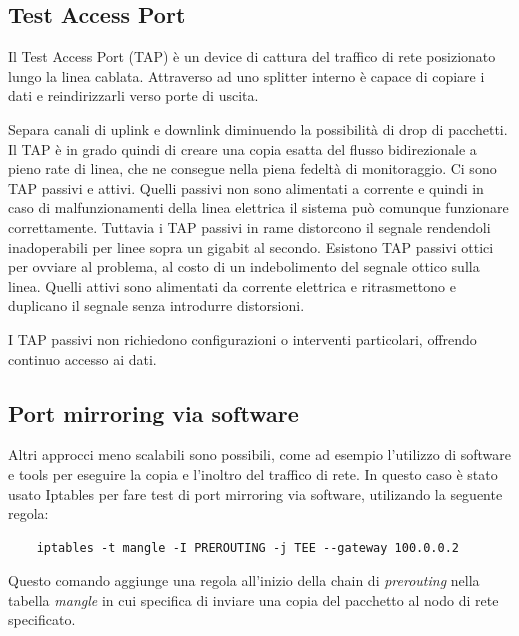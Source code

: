 \subsection{Test Access Port}
Il Test Access Port (TAP) è un device di cattura del traffico di rete posizionato lungo la linea cablata. Attraverso ad uno splitter interno è capace di copiare i dati e reindirizzarli verso porte di uscita.

Separa canali di uplink e downlink diminuendo  la possibilità di drop di pacchetti.
Il TAP è in grado quindi di creare una copia esatta del flusso bidirezionale a pieno rate di linea, che ne consegue nella piena fedeltà di monitoraggio.
Ci sono TAP passivi e attivi.
Quelli passivi non sono alimentati a  corrente e quindi in caso di malfunzionamenti della linea elettrica il sistema può comunque funzionare correttamente. Tuttavia i TAP passivi in rame distorcono il segnale rendendoli inadoperabili per linee sopra un gigabit al secondo. Esistono TAP passivi ottici per ovviare al problema, al costo di un indebolimento del segnale ottico sulla linea.
Quelli attivi sono alimentati da corrente elettrica e ritrasmettono e duplicano il segnale senza introdurre distorsioni.

I TAP passivi non richiedono configurazioni o interventi particolari, offrendo continuo accesso ai dati.


\subsection{Port mirroring via software}
Altri approcci meno scalabili sono possibili, come ad esempio l'utilizzo di software e tools per eseguire la copia e l'inoltro del traffico di rete.
In questo caso è stato usato Iptables per fare test di port mirroring via software, utilizando la seguente regola:
\begin{verbatim}
    iptables -t mangle -I PREROUTING -j TEE --gateway 100.0.0.2 
\end{verbatim}
Questo comando aggiunge una regola all'inizio della chain di \textit{prerouting} nella tabella \textit{mangle} in cui specifica di inviare una copia del pacchetto al nodo di rete specificato.



